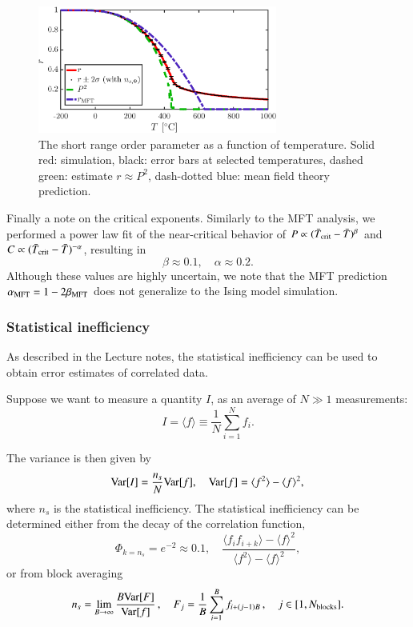 \begin{figure}[!ht]
\begin{center}
  \includegraphics[width=0.7\textwidth]{../figures/r} 
  \caption{The short range order parameter as a function of temperature. Solid red: simulation, black: error bars at selected temperatures, dashed green: estimate $r \approx P^2$, dash-dotted blue: mean field theory prediction. }
  \label{fig:r}
\end{center}
\end{figure}

Finally a note on the critical exponents. Similarly to the MFT analysis, we performed a power law fit of 
the near-critical behavior of
$P\propto(\bar{T}_{\rm crit}-\bar{T})^{\beta}$ and
$C\propto(\bar{T}_{\rm crit}-\bar{T})^{-\alpha}$, resulting in  
\begin{equation}
\beta \approx 0.1, \quad \alpha \approx 0.2.
\end{equation}
Although these values are highly uncertain, we note that the MFT prediction $\alpha_{\rm MFT} = 1-2\beta_{\rm MFT} $ does not generalize to the Ising model simulation. 

\subsubsection*{Statistical inefficiency}
\label{sec:ns}
As described in the Lecture notes, the statistical inefficiency can be used to obtain error estimates of correlated data. 

Suppose we want to measure a quantity $I$, as an average of $N\gg1$ measurements: 
\begin{equation}
I = \langle f \rangle \equiv \frac{1}{N}\sum_{i = 1}^N f_i.
\end{equation}

The variance is then given by 
\begin{equation}
{\rm Var}[I] = \frac{n_s}{N}{\rm Var}[f], \quad {\rm Var}[f] = \langle f^2 \rangle - \langle f \rangle^2,
\end{equation}
where $n_s$ is the statistical inefficiency. 
The statistical inefficiency can be determined either from the decay of the correlation function, 
\begin{equation}
\Phi_{k = n_s} = e^{-2} \approx 0.1, \quad \frac{\langle f_i f_{i+k}\rangle - \langle f \rangle^2}{\langle f^2\rangle - \langle f \rangle^2},
\label{eq:ns_Phi}
\end{equation}
or from block averaging
\begin{equation}
n_s = \lim_{B \rightarrow \infty} \frac{B {\rm Var}[F]}{{\rm Var}[f]}\,, \quad F_j = \frac{1}{B}\sum_{i = 1}^B f_{i + (j-1)B}\,, \quad j \in [1, N_{\rm blocks} ].
\label{eq:ns_block}
\end{equation}

